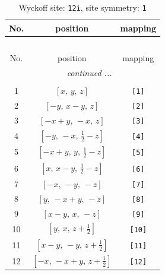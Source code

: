 \documentclass[fleqn,8pt]{jsarticle}
\begin{document}
\renewcommand{\arraystretch}{1.2}
\begin{longtable}{ccc}
\caption{Wyckoff site: {\tt 12i}, site symmetry: {\tt 1}}
 \\
 \hline \hline
No. & position & mapping \\ \hline \endfirsthead

\multicolumn{2}{l}{\tablename\ \thetable{}} \\
 \hline \hline
No. & position & mapping \\ \hline \endhead

 \hline \hline
\multicolumn{2}{r}{\footnotesize\it continued ...} \\ \endfoot

 \hline \hline
\multicolumn{2}{r}{} \\ \endlastfoot

1 & $\left[ x,\, y,\, z \right]$ & {\tt [1]} \\ \hline
2 & $\left[ - y,\, x - y,\, z \right]$ & {\tt [2]} \\ \hline
3 & $\left[ - x + y,\, - x,\, z \right]$ & {\tt [3]} \\ \hline
4 & $\left[ - y,\, - x,\, \frac{1}{2} - z \right]$ & {\tt [4]} \\ \hline
5 & $\left[ - x + y,\, y,\, \frac{1}{2} - z \right]$ & {\tt [5]} \\ \hline
6 & $\left[ x,\, x - y,\, \frac{1}{2} - z \right]$ & {\tt [6]} \\ \hline
7 & $\left[ - x,\, - y,\, - z \right]$ & {\tt [7]} \\ \hline
8 & $\left[ y,\, - x + y,\, - z \right]$ & {\tt [8]} \\ \hline
9 & $\left[ x - y,\, x,\, - z \right]$ & {\tt [9]} \\ \hline
10 & $\left[ y,\, x,\, z + \frac{1}{2} \right]$ & {\tt [10]} \\ \hline
11 & $\left[ x - y,\, - y,\, z + \frac{1}{2} \right]$ & {\tt [11]} \\ \hline
12 & $\left[ - x,\, - x + y,\, z + \frac{1}{2} \right]$ & {\tt [12]} \\
\end{longtable}
\end{document}

